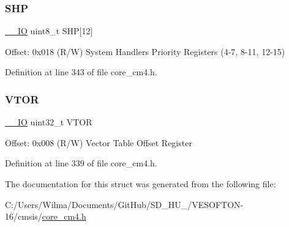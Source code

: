 \mbox{\label{struct_s_c_b___type_a17dc9f83c53cbf7fa249e79a2d2a43f8}} 
\subsubsection{\texorpdfstring{S\+HP}{SHP}}
{\footnotesize\ttfamily \hyperlink{group___c_m_s_i_s__core__definitions_gaec43007d9998a0a0e01faede4133d6be}{\+\_\+\+\_\+\+IO} uint8\+\_\+t S\+HP\mbox{[}12\mbox{]}}

Offset\+: 0x018 (R/W) System Handlers Priority Registers (4-\/7, 8-\/11, 12-\/15) 

Definition at line 343 of file core\+\_\+cm4.\+h.

\mbox{\label{struct_s_c_b___type_aaf388a921a016cae590cfcf1e43b1cdf}} 
\subsubsection{\texorpdfstring{V\+T\+OR}{VTOR}}
{\footnotesize\ttfamily \hyperlink{group___c_m_s_i_s__core__definitions_gaec43007d9998a0a0e01faede4133d6be}{\+\_\+\+\_\+\+IO} uint32\+\_\+t V\+T\+OR}

Offset\+: 0x008 (R/W) Vector Table Offset Register 

Definition at line 339 of file core\+\_\+cm4.\+h.



The documentation for this struct was generated from the following file\+:\begin{DoxyCompactItemize}
\item 
C\+:/\+Users/\+Wilma/\+Documents/\+Git\+Hub/\+S\+D\+\_\+\+H\+U\+\_/\+V\+E\+S\+O\+F\+T\+O\+N-\/16/cmsis/\hyperlink{core__cm4_8h}{core\+\_\+cm4.\+h}\end{DoxyCompactItemize}
